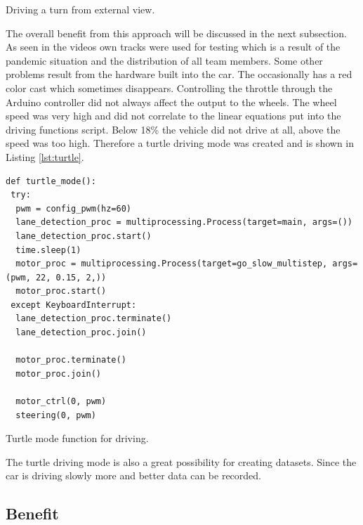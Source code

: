 \documentclass[conference]{IEEEtran}
\begin{document}
\begin{video}[h]
	\caption{Driving a turn from external view.}
	\label{vid:uturn}
	\centering
\end{video}

The overall benefit from this approach will be discussed in the next subsection.
As seen in the videos own tracks were used for testing which is a result of the pandemic situation and the distribution of all team members.
Some other problems result from the hardware built into the car.
The occasionally has a red color cast which sometimes disappears.
Controlling the throttle through the Arduino controller did not always affect the output to the wheels.
The wheel speed was very high and did not correlate to the linear equations put into the driving functions script.
Below 18\% the vehicle did not drive at all, above the speed was too high.
Therefore a turtle driving mode was created and is shown in Listing \ref{lst:turtle}.

\begin{mylist}[h]
\begin{verbatim}
def turtle_mode():
 try:
  pwm = config_pwm(hz=60)
  lane_detection_proc = multiprocessing.Process(target=main, args=())
  lane_detection_proc.start()
  time.sleep(1)
  motor_proc = multiprocessing.Process(target=go_slow_multistep, args=(pwm, 22, 0.15, 2,))
  motor_proc.start()
 except KeyboardInterrupt:
  lane_detection_proc.terminate()
  lane_detection_proc.join()

  motor_proc.terminate()
  motor_proc.join()

  motor_ctrl(0, pwm)
  steering(0, pwm)
\end{verbatim}
\caption{Turtle mode function for driving.}
\label{lst:turtle}
\end{mylist}

The turtle driving mode is also a great possibility for creating datasets.
Since the car is driving slowly more and better data can be recorded.

\subsection{Benefit}
\end{document}
